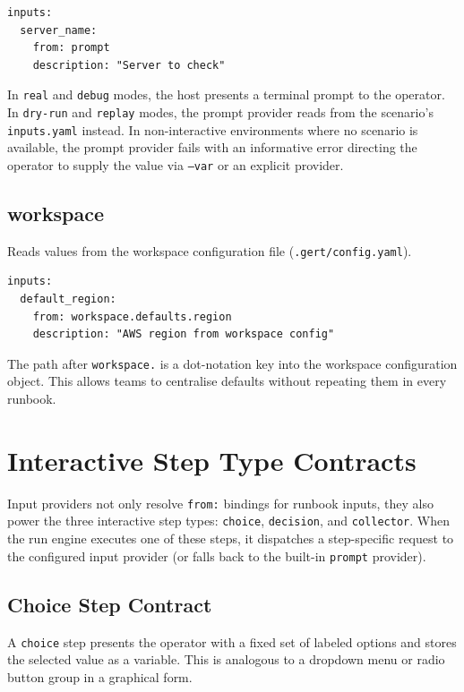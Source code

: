 \begin{verbatim}
inputs:
  server_name:
    from: prompt
    description: "Server to check"
\end{verbatim}

In \texttt{real} and \texttt{debug} modes, the host presents a terminal prompt
to the operator.  In \texttt{dry-run} and \texttt{replay} modes, the prompt
provider reads from the scenario's \texttt{inputs.yaml} instead.  In
non-interactive environments where no scenario is available, the prompt provider
fails with an informative error directing the operator to supply the value via
\texttt{--var} or an explicit provider.

\subsection{workspace}

Reads values from the workspace configuration file
(\texttt{.gert/config.yaml}).

\begin{verbatim}
inputs:
  default_region:
    from: workspace.defaults.region
    description: "AWS region from workspace config"
\end{verbatim}

The path after \texttt{workspace.} is a dot-notation key into the workspace
configuration object.  This allows teams to centralise defaults without
repeating them in every runbook.

\section{Interactive Step Type Contracts}
\label{sec:interactive-step-contracts}

Input providers not only resolve \texttt{from:} bindings for runbook inputs,
they also power the three interactive step types: \texttt{choice},
\texttt{decision}, and \texttt{collector}.  When the run engine executes one of
these steps, it dispatches a step-specific request to the configured input
provider (or falls back to the built-in \texttt{prompt} provider).

\subsection{Choice Step Contract}
\label{subsec:choice-contract}

A \texttt{choice} step presents the operator with a fixed set of labeled
options and stores the selected value as a variable.  This is analogous to a
dropdown menu or radio button group in a graphical form.

